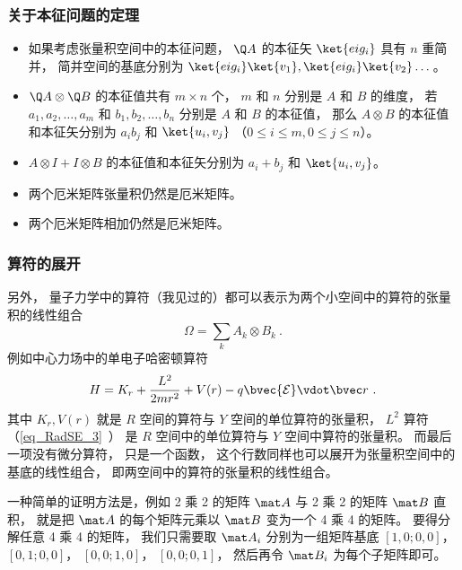 \subsubsection{关于本征问题的定理}%

\begin{itemize}
\item 如果考虑张量积空间中的本征问题， $\Q A$  的本征矢 $\ket{eig_i}$ 具有 $n$ 重简并， 简并空间的基底分别为 $\ket{eig_i}\ket{v_1}, \ket{eig_i}\ket{v_2}\dots$。 

\item $\Q A \otimes \Q B$ 的本征值共有 $m \times n$ 个， $m$ 和 $n$ 分别是 $A$ 和 $B$ 的维度， 若 $a_1, a_2,\dots, a_m$ 和 $b_1, b_2, \dots, b_n$ 分别是 $A$ 和 $B$ 的本征值， 那么 $A \otimes B$ 的本征值和本征矢分别为 $a_i b_j$ 和 $\ket{u_i, v_j}$ （$0 \leqslant i \leqslant m,  0 \leqslant j \leqslant n$）。

\item $A \otimes I + I \otimes B$ 的本征值和本征矢分别为 $a_i + b_j$ 和 $\ket{u_i, v_j}$。

\item 两个厄米矩阵张量积仍然是厄米矩阵。

\item 两个厄米矩阵相加仍然是厄米矩阵。
\end{itemize}

\subsubsection{算符的展开}
另外， 量子力学中的算符（我见过的）都可以表示为两个小空间中的算符的张量积的线性组合
\begin{equation}
\Omega = \sum_k A_k \otimes B_k~.
\end{equation}
例如中心力场中的单电子哈密顿算符
\begin{equation}
H = K_r + \frac{L^2}{2mr^2} + V(r) - q\bvec{\mathcal{E}} \vdot \bvec r~.
\end{equation}
其中 $K_r, V(r)$ 就是 $R$ 空间的算符与 $Y$ 空间的单位算符的张量积， $L^2$ 算符（\autoref{eq_RadSE_3}~） 是 $R$ 空间中的单位算符与 $Y$ 空间中算符的张量积。 而最后一项没有微分算符， 只是一个函数， 这个行数同样也可以展开为张量积空间中的基底的线性组合， 即两空间中的算符的张量积的线性组合。

一种简单的证明方法是，例如 2 乘 2 的矩阵 $\mat A$ 与 2 乘 2 的矩阵 $\mat B$ 直积， 就是把 $\mat A$ 的每个矩阵元乘以 $\mat B$ 变为一个 4 乘 4 的矩阵。 要得分解任意 4 乘 4 的矩阵， 我们只需要取 $\mat A_i$ 分别为一组矩阵基底 $[1, 0; 0, 0]$， $[0, 1; 0, 0]$， $[0, 0; 1, 0]$， $[0, 0; 0, 1]$， 然后再令 $\mat B_i$ 为每个子矩阵即可。

